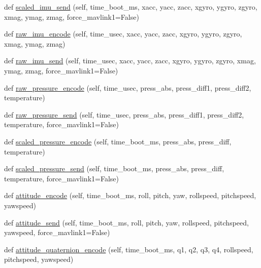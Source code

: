 \begin{DoxyCompactItemize}
\item 
def \hyperlink{classpymavlink_1_1dialects_1_1v10_1_1MAVLink_ae93f5f8c404d88f45f232290bb128dac}{scaled\+\_\+imu\+\_\+send} (self, time\+\_\+boot\+\_\+ms, xacc, yacc, zacc, xgyro, ygyro, zgyro, xmag, ymag, zmag, force\+\_\+mavlink1=False)
\item 
def \hyperlink{classpymavlink_1_1dialects_1_1v10_1_1MAVLink_a106a3af40129278c05f6205932a32ddc}{raw\+\_\+imu\+\_\+encode} (self, time\+\_\+usec, xacc, yacc, zacc, xgyro, ygyro, zgyro, xmag, ymag, zmag)
\item 
def \hyperlink{classpymavlink_1_1dialects_1_1v10_1_1MAVLink_acc709eee31435a187302d5d9a47b6cb3}{raw\+\_\+imu\+\_\+send} (self, time\+\_\+usec, xacc, yacc, zacc, xgyro, ygyro, zgyro, xmag, ymag, zmag, force\+\_\+mavlink1=False)
\item 
def \hyperlink{classpymavlink_1_1dialects_1_1v10_1_1MAVLink_a590f61162c2a9cadef5e7c0e38e5e6ad}{raw\+\_\+pressure\+\_\+encode} (self, time\+\_\+usec, press\+\_\+abs, press\+\_\+diff1, press\+\_\+diff2, temperature)
\item 
def \hyperlink{classpymavlink_1_1dialects_1_1v10_1_1MAVLink_a1ddaad5d2c8ed739c4a0318318c8ffe6}{raw\+\_\+pressure\+\_\+send} (self, time\+\_\+usec, press\+\_\+abs, press\+\_\+diff1, press\+\_\+diff2, temperature, force\+\_\+mavlink1=False)
\item 
def \hyperlink{classpymavlink_1_1dialects_1_1v10_1_1MAVLink_a887b03743667bd9ea3f28473ed399ee5}{scaled\+\_\+pressure\+\_\+encode} (self, time\+\_\+boot\+\_\+ms, press\+\_\+abs, press\+\_\+diff, temperature)
\item 
def \hyperlink{classpymavlink_1_1dialects_1_1v10_1_1MAVLink_ac667ab85658b7ed0dbf8a231b5895ec6}{scaled\+\_\+pressure\+\_\+send} (self, time\+\_\+boot\+\_\+ms, press\+\_\+abs, press\+\_\+diff, temperature, force\+\_\+mavlink1=False)
\item 
def \hyperlink{classpymavlink_1_1dialects_1_1v10_1_1MAVLink_a582b5974f4a4685bd63147dda004ad43}{attitude\+\_\+encode} (self, time\+\_\+boot\+\_\+ms, roll, pitch, yaw, rollspeed, pitchspeed, yawspeed)
\item 
def \hyperlink{classpymavlink_1_1dialects_1_1v10_1_1MAVLink_a8ca74919a63838a29eedc74a1ad830b5}{attitude\+\_\+send} (self, time\+\_\+boot\+\_\+ms, roll, pitch, yaw, rollspeed, pitchspeed, yawspeed, force\+\_\+mavlink1=False)
\item 
def \hyperlink{classpymavlink_1_1dialects_1_1v10_1_1MAVLink_a4f8a7c528d9410851438a9e2885bce4d}{attitude\+\_\+quaternion\+\_\+encode} (self, time\+\_\+boot\+\_\+ms, q1, q2, q3, q4, rollspeed, pitchspeed, yawspeed)

\end{DoxyCompactItemize}
